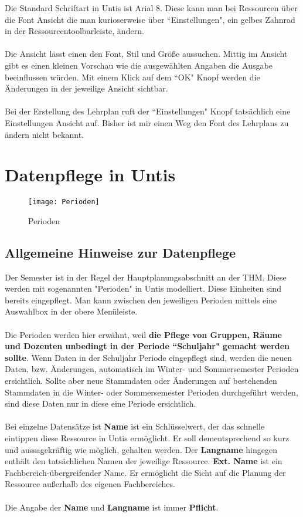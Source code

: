 \documentclass[]{report}
\begin{document}
Die Standard Schriftart in Untis ist Arial 8. Diese kann man bei Ressourcen über die Font Ansicht die man kurioserweise über ``Einstellungen", ein gelbes Zahnrad in der Ressourcentoolbarleiste, ändern.\\
\\
Die Ansicht lässt einen den Font, Stil und Größe aussuchen. Mittig im Ansicht gibt es einen kleinen Vorschau wie die ausgewählten Angaben die Ausgabe beeinflussen würden. Mit einem Klick auf dem ``OK" Knopf werden die Änderungen in der jeweilige Ansicht sichtbar.\\
\\
Bei der Erstellung des Lehrplan ruft der ``Einstellungen" Knopf tatsächlich eine Einstellungen Ansicht auf. Bisher ist mir einen Weg den Font des Lehrplans zu ändern nicht bekannt.

\chapter{Datenpflege in Untis}

\begin{wrapfigure}{r}{0.4\textwidth}
	\vspace{-15pt}
	\texttt{[image: Perioden]}
	\vspace{-15pt}
	\caption{Perioden}
	\label{fig:mf-sg}
\end{wrapfigure}

\section{Allgemeine Hinweise zur Datenpflege}
Der Semester ist in der Regel der Hauptplanungsabschnitt an der THM. Diese werden mit sogenannten "Perioden" in Untis modelliert. Diese Einheiten sind bereits eingepflegt. Man kann zwischen den jeweiligen Perioden mittels eine Auswahlbox in der obere Menüleiste.\\
\\
Die Perioden werden hier erwähnt, weil \textbf{die Pflege von Gruppen, Räume und Dozenten unbedingt in der Periode ``Schuljahr" gemacht werden sollte}. Wenn Daten in der Schuljahr Periode eingepflegt sind, werden die neuen Daten, bzw. Änderungen, automatisch im Winter- und Sommersemester Perioden ersichtlich. Sollte aber neue Stammdaten oder Änderungen auf bestehenden Stammdaten in die Winter- oder Sommersemester Perioden durchgeführt werden, sind diese Daten nur in diese eine Periode ersichtlich.\\
\\
Bei einzelne Datensätze ist \textbf{Name} ist ein Schlüsselwert, der das schnelle eintippen diese Ressource in Untis ermöglicht. Er soll dementsprechend so kurz und aussagekräftig wie möglich, gehalten werden. Der \textbf{Langname} hingegen enthält den tatsächlichen Namen der jeweilige Ressource. \textbf{Ext. Name} ist ein Fachbereich-übergreifender Name. Er ermöglicht die Sicht auf die Planung der Ressource außerhalb des eigenen Fachbereiches.\\
\\
Die Angabe der \textbf{Name} und \textbf{Langname} ist immer \textbf{Pflicht}.
\end{document}
